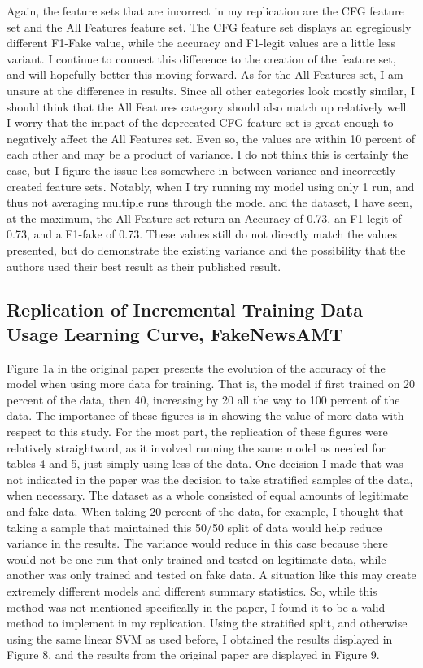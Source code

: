 \documentclass{article}
\begin{document}
Again, the feature sets that are incorrect in my replication are the CFG feature set and the All Features feature set. The CFG feature set displays an egregiously different F1-Fake value, while the accuracy and F1-legit values are a little less variant. I continue to connect this difference to the creation of the feature set, and will hopefully better this moving forward. As for the All Features set, I am unsure at the difference in results. Since all other categories look mostly similar, I should think that the All Features category should also match up relatively well. I worry that the impact of the deprecated CFG feature set is great enough to negatively affect the All Features set. Even so, the values are within 10 percent of each other and may be a product of variance. I do not think this is certainly the case, but I figure the issue lies somewhere in between variance and incorrectly created feature sets. Notably, when I try running my model using only 1 run, and thus not averaging multiple runs through the model and the dataset, I have seen, at the maximum, the All Feature set return an Accuracy of 0.73, an F1-legit of 0.73, and a F1-fake of 0.73. These values still do not directly match the values presented, but do demonstrate the existing variance and the possibility that the authors used their best result as their published result.


\subsection{Replication of Incremental Training Data Usage Learning Curve, FakeNewsAMT}

Figure 1a in the original paper presents the evolution of the accuracy of the model when using more data for training. That is, the model if first trained on 20 percent of the data, then 40, increasing by 20 all the way to 100 percent of the data. The importance of these figures is in showing the value of more data with respect to this study. For the most part, the replication of these figures were relatively straightword, as it involved running the same model as needed for tables 4 and 5, just simply using less of the data. One decision I made that was not indicated in the paper was the decision to take stratified samples of the data, when necessary. The dataset as a whole consisted of equal amounts of legitimate and fake data. When taking 20 percent of the data, for example, I thought that taking a sample that maintained this 50/50 split of data would help reduce variance in the results. The variance would reduce in this case because there would not be one run that only trained and tested on legitimate data, while another was only trained and tested on fake data. A situation like this may create extremely different models and different summary statistics. So, while this method was not mentioned specifically in the paper, I found it to be a valid method to implement in my replication. Using the stratified split, and otherwise using the same linear SVM as used before, I obtained the results displayed in Figure 8, and the results from the original paper are displayed in Figure 9.
\end{document}
